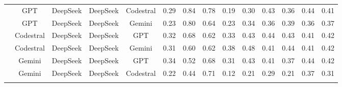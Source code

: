\documentclass[authoryear,final,5p,times,twocolumn]{elsarticle}
\theoremstyle{plain}
\begin{document}
\begin{table}[p]
{\begin{tabular}{
>{\centering\arraybackslash}l
*{13}{>{\centering\arraybackslash}c}
}
& GPT & DeepSeek & DeepSeek & Codestral & \cellcolor{red!11}0.29 & \cellcolor{green!14}0.84 & \cellcolor{orange!10}0.78 & \cellcolor{red!10}0.19 & \cellcolor{orange!16}0.30 & \cellcolor{orange!10}0.43 & \cellcolor{orange!14}0.36 & \cellcolor{orange!19}0.44 & \cellcolor{orange!19}0.41 \\
& GPT & DeepSeek & DeepSeek & Gemini & \cellcolor{red!14}0.23 & \cellcolor{green!13}0.80 & \cellcolor{red!11}0.64 & \cellcolor{orange!18}0.23 & \cellcolor{orange!13}0.34 & \cellcolor{orange!15}0.36 & \cellcolor{orange!12}0.39 & \cellcolor{red!14}0.36 & \cellcolor{red!13}0.37 \\
& Codestral & DeepSeek & DeepSeek & GPT & \cellcolor{red!10}0.32 & \cellcolor{orange!10}0.68 & \cellcolor{red!12}0.62 & \cellcolor{orange!11}0.33 & \cellcolor{green!12}0.43 & \cellcolor{green!10}0.44 & \cellcolor{green!10}0.43 & \cellcolor{red!11}0.41 & \cellcolor{orange!18}0.42 \\
& Codestral & DeepSeek & DeepSeek & Gemini & \cellcolor{red!10}0.31 & \cellcolor{orange!13}0.60 & \cellcolor{red!12}0.62 & \cellcolor{green!11}0.38 & \cellcolor{green!15}0.48 & \cellcolor{orange!11}0.41 & \cellcolor{green!11}0.44 & \cellcolor{red!11}0.41 & \cellcolor{orange!18}0.42 \\
& Gemini & DeepSeek & DeepSeek & GPT & \cellcolor{orange!19}0.34 & \cellcolor{orange!16}0.52 & \cellcolor{orange!18}0.68 & \cellcolor{orange!12}0.31 & \cellcolor{green!12}0.43 & \cellcolor{orange!11}0.41 & \cellcolor{orange!13}0.37 & \cellcolor{orange!19}0.44 & \cellcolor{orange!18}0.42 \\
& Gemini & DeepSeek & DeepSeek & Codestral & \cellcolor{red!14}0.22 & \cellcolor{orange!18}0.44 & \cellcolor{orange!15}0.71 & \cellcolor{red!15}0.12 & \cellcolor{red!12}0.21 & \cellcolor{red!10}0.29 & \cellcolor{red!14}0.21 & \cellcolor{red!13}0.37 & \cellcolor{red!20}0.31 \\
\addlinespace[1.5ex]


\end{tabular}}
\end{table}
\end{document}
